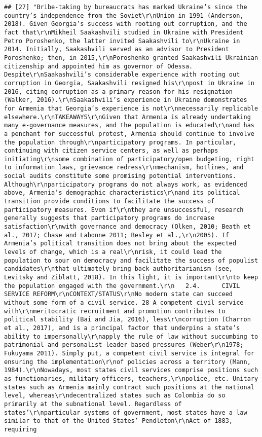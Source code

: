 \documentclass[
]{article}
\begin{document}
\begin{verbatim}
## [27] "Bribe-taking by bureaucrats has marked Ukraine’s since the country’s independence from the Soviet\r\nUnion in 1991 (Anderson, 2018). Given Georgia’s success with rooting out corruption, and the fact that\r\nMikheil Saakashvili studied in Ukraine with President Petro Poroshenko, the latter invited Saakashvili to\r\nUkraine in 2014. Initially, Saakashvili served as an advisor to President Poroshenko; then, in 2015,\r\nPoroshenko granted Saakashvili Ukrainian citizenship and appointed him as governor of Odessa. Despite\r\nSaakashvili’s considerable experience with rooting out corruption in Georgia, Saakashvili resigned his\r\npost in Ukraine in 2016, citing corruption as a primary reason for his resignation (Walker, 2016).\r\nSaakashvili’s experience in Ukraine demonstrates for Armenia that Georgia’s experience is not\r\nnecessarily replicable elsewhere.\r\nTAKEAWAYS\r\nGiven that Armenia is already undertaking many e-governance measures, and the population is educated\r\nand has a penchant for successful protest, Armenia should continue to involve the population through\r\nparticipatory programs. In particular, continuing with citizen service centers, as well as perhaps initiating\r\nsome combination of participatory/open budgeting, right to information laws, grievance redress\r\nmechanism, hotlines, and social audits constitute some promising potential interventions. Although\r\nparticipatory programs do not always work, as evidenced above, Armenia’s demographic characteristics\r\nand its political transition provide conditions to facilitate the success of participatory measures. Even if\r\nthey are unsuccessful, research generally suggests that participatory programs do increase satisfaction\r\nwith governance and democracy (Olken, 2010; Beath et al., 2017; Chase and Labonne 2011; Besley et al.,\r\n2005). If Armenia’s political transition does not bring about the expected levels of change, which is a real\r\nrisk, it could lead the population to sour on democracy and facilitate the success of populist candidates\r\nthat ultimately bring back authoritarianism (see, Levitsky and Ziblatt, 2018). In this light, it is important\r\nto keep the population engaged with the government.\r\n   2.4.      CIVIL SERVICE REFORM\r\nCONTEXT/STATUS\r\nNo modern state can succeed without some form of a civil service. 28 A competent civil service with\r\nmeritocratic recruitment and promotion contributes to political stability (Bai and Jia, 2016), less\r\ncorruption (Charron et al., 2017), and is a principal factor that underpins a state’s ability to impersonally\r\napply the rule of law without succumbing to patrimonial and personalist leader-based pressures (Weber\r\n1978; Fukuyama 2011). Simply put, a competent civil service is integral for ensuring the implementation\r\nof policies across a territory (Mann, 1984).\r\nNowadays, most states civil services comprise positions such as functionaries, military officers, teachers,\r\npolice, etc. Unitary states such as Armenia mainly contract such positions at the national level, whereas\r\ndecentralized states such as Colombia do so primarily at the subnational level. Regardless of states’\r\nparticular systems of government, most states have a law similar to that of the United States’ Pendleton\r\nAct of 1883, requiring 
\end{verbatim}
\end{document}
